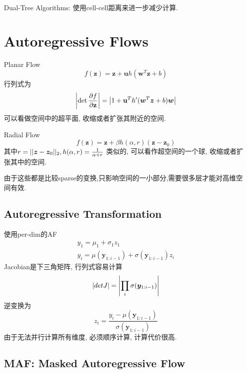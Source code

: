\documentclass{article}
\begin{document}
Dual-Tree Algorithms: 使用cell-cell距离来进一步减少计算.

\section{Autoregressive Flows}

Planar Flow
\begin{equation}
    f(\mathbf{z})=\mathbf{z}+\mathbf{u} h\left(\mathbf{w}^{T} \mathbf{z}+b\right)
\end{equation}
行列式为
\begin{equation}
    \left|\operatorname{det} \frac{\partial f}{\partial \mathbf{z}}\right|=\left|1+\mathbf{u}^{T} h'(\boldsymbol{w}^T \boldsymbol{z}+b)\boldsymbol{w}\right|
\end{equation}
可以看做空间中的超平面, 收缩或者扩张其附近的空间.

Radial Flow
\begin{equation}
    f(\mathbf{z})=\mathbf{z}+\beta h(\alpha, r)\left(\mathbf{z}-\mathbf{z}_{0}\right)
\end{equation}
其中$r=||\boldsymbol{z}-\boldsymbol{z}_0||_2, h(\alpha, r) = \frac{1}{\alpha+r}$
类似的, 可以看作超空间的一个球, 收缩或者扩张其中的空间.

由于这些都是比较sparse的变换,只影响空间的一小部分,需要很多层才能对高维空间有效.

\subsection{Autoregressive Transformation}

使用per-dim的AF
\begin{equation}
    \begin{array}{c}
    y_{1}=\mu_{1}+\sigma_{1} z_{1} \\
    y_{i}=\mu\left(\mathbf{y}_{1: i-1}\right)+\sigma\left(\mathbf{y}_{1: i-1}\right) z_{i}
    \end{array}
    \label{MAF}
\end{equation}
Jacobian是下三角矩阵, 行列式容易计算
\begin{equation}
    |det J| = \left|\prod_i \sigma(\boldsymbol{y}_{1:i-1})\right|
\end{equation}
逆变换为
\begin{equation}
    z_{i}=\frac{y_{i}-\mu\left(\mathbf{y}_{1: i-1}\right)}{\sigma\left(\mathbf{y}_{1: i-1}\right)}
    \label{IAF}
\end{equation}
由于无法并行计算所有维度, 必须顺序计算, 计算代价很高.

\subsection{MAF: Masked Autoregressive Flow}
\end{document}
